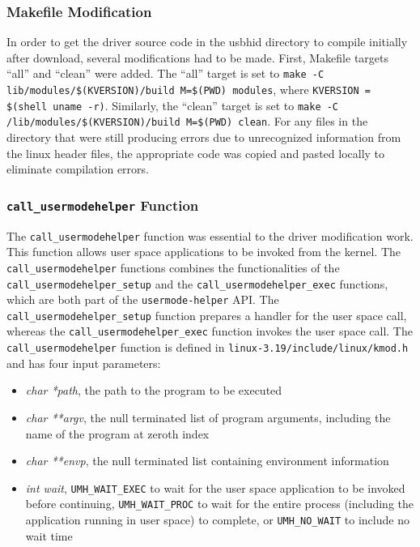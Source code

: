 \documentclass[pagenumbers]{ieee}
\begin{document}
\subsubsection{Makefile Modification}

In order to get the driver source code in the usbhid directory to compile initially after download, several modifications had to be made. First, Makefile targets ``all'' and ``clean'' were added. The ``all'' target is set to \texttt{make -C lib/modules/\$(KVERSION)/build M=\$(PWD) modules}, where \texttt{KVERSION = \$(shell uname -r)}. Similarly, the ``clean'' target is set to \texttt{make -C /lib/modules/\$(KVERSION)/build M=\$(PWD) clean}. For any files in the directory that were still producing errors due to unrecognized information from the linux header files, the appropriate code was copied and pasted locally to eliminate compilation errors.

\subsubsection{\texttt{call\_usermodehelper} Function}

The \texttt{call\_usermodehelper} function was essential to the driver modification work. This function allows user space applications to be invoked from the kernel. The \texttt{call\_usermodehelper} functions combines the functionalities of the \texttt{call\_usermodehelper\_setup} and the \texttt{call\_usermodehelper\_exec} functions, which are both part of the \texttt{usermode-helper} API. The \texttt{call\_usermodehelper\_setup} function prepares a handler for the user space call, whereas the \texttt{call\_usermodehelper\_exec} function invokes the user space call. The \texttt{call\_usermodehelper} function is defined in \texttt{linux-3.19/include/linux/kmod.h} and has four input parameters:
\begin{itemize}
\item \textit{char *path}, the path to the program to be executed
\item \textit{char **argv}, the null terminated list of program arguments, including the name of the program at zeroth index
\item \textit{char **envp}, the null terminated list containing environment information 
\item \textit{int wait}, \texttt{UMH\_WAIT\_EXEC} to wait for the user space application to be invoked before continuing, \texttt{UMH\_WAIT\_PROC} to wait for the entire process (including the application running in user space) to complete, or \texttt{UMH\_NO\_WAIT} to include no wait time
\end{itemize}
\end{document}
